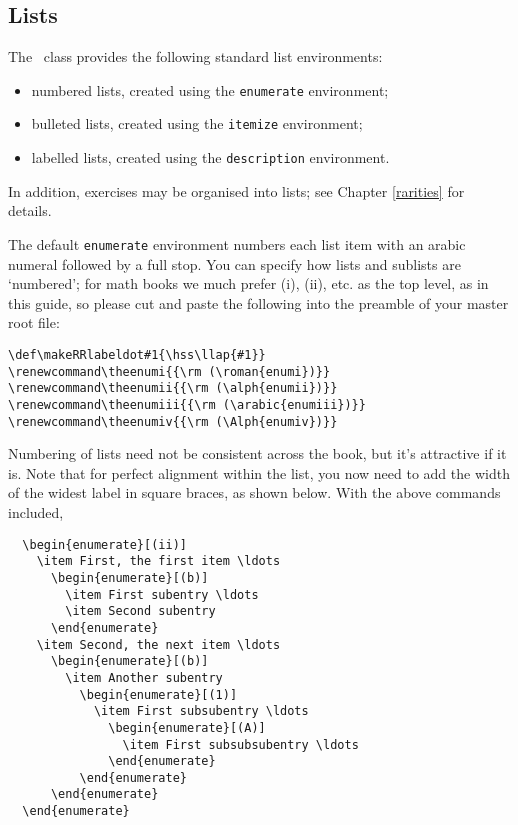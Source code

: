 \subsection{Lists}
The \cambridge\ class provides the following standard list environments:
\begin{itemize}
 \item numbered lists, created using the \verb"enumerate" environment;
 \item bulleted lists, created using the \verb"itemize" environment;
 \item labelled lists, created using the \verb"description" environment.
\end{itemize}
In addition, exercises may be organised into lists; see Chapter \ref{rarities} for details.

The default \verb"enumerate" environment numbers each list item with
an arabic numeral followed by a full stop. You can specify how lists and sublists are `numbered';
for math books we much prefer  (i), (ii), etc. as the top level, as in this guide, so
please cut and paste the following into the preamble of your master root file:\\[0.25\baselineskip]
\begin{verbatim}
\def\makeRRlabeldot#1{\hss\llap{#1}}
\renewcommand\theenumi{{\rm (\roman{enumi})}}
\renewcommand\theenumii{{\rm (\alph{enumii})}}
\renewcommand\theenumiii{{\rm (\arabic{enumiii})}}
\renewcommand\theenumiv{{\rm (\Alph{enumiv})}}
\end{verbatim}
Numbering of lists need not be consistent across the book, but it's attractive if it is. Note that for perfect alignment within the list, you now need to add the width of the widest label in square braces, as shown below. With the above commands included,\\[0.25\baselineskip]
\begin{verbatim}
  \begin{enumerate}[(ii)]
    \item First, the first item \ldots
      \begin{enumerate}[(b)]
        \item First subentry \ldots
        \item Second subentry
      \end{enumerate}
    \item Second, the next item \ldots
      \begin{enumerate}[(b)]
        \item Another subentry
          \begin{enumerate}[(1)]
            \item First subsubentry \ldots
              \begin{enumerate}[(A)]
                \item First subsubsubentry \ldots
              \end{enumerate}
          \end{enumerate}
      \end{enumerate}
  \end{enumerate}
\end{verbatim}

